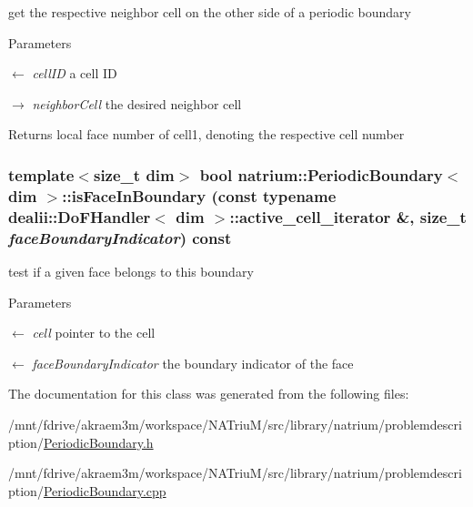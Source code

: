 get the respective neighbor cell on the other side of a periodic boundary 
\begin{DoxyParams}{Parameters}
\item[\mbox{$\leftarrow$} {\em cellID}]a cell ID \item[\mbox{$\rightarrow$} {\em neighborCell}]the desired neighbor cell\end{DoxyParams}
\begin{DoxyReturn}{Returns}
local face number of cell1, denoting the respective cell number 
\end{DoxyReturn}
\hypertarget{classnatrium_1_1PeriodicBoundary_af43c1306653cc8a9d5aea68edcfca370}{
\subsubsection[{isFaceInBoundary}]{\setlength{\rightskip}{0pt plus 5cm}template$<$size\_\-t dim$>$ bool {\bf natrium::PeriodicBoundary}$<$ dim $>$::isFaceInBoundary (const typename dealii::DoFHandler$<$ dim $>$::active\_\-cell\_\-iterator \&, \/  size\_\-t {\em faceBoundaryIndicator}) const}}
\label{classnatrium_1_1PeriodicBoundary_af43c1306653cc8a9d5aea68edcfca370}


test if a given face belongs to this boundary 
\begin{DoxyParams}{Parameters}
\item[\mbox{$\leftarrow$} {\em cell}]pointer to the cell \item[\mbox{$\leftarrow$} {\em faceBoundaryIndicator}]the boundary indicator of the face \end{DoxyParams}


The documentation for this class was generated from the following files:\begin{DoxyCompactItemize}
\item 
/mnt/fdrive/akraem3m/workspace/NATriuM/src/library/natrium/problemdescription/\hyperlink{PeriodicBoundary_8h}{PeriodicBoundary.h}\item 
/mnt/fdrive/akraem3m/workspace/NATriuM/src/library/natrium/problemdescription/\hyperlink{PeriodicBoundary_8cpp}{PeriodicBoundary.cpp}\end{DoxyCompactItemize}
